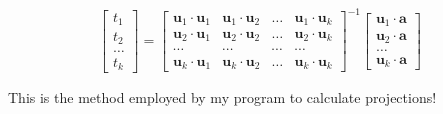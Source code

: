 \documentclass[12pt,leqno]{amsart}
\begin{document}
$$ \begin{bmatrix}
	t_1 \\
	t_2 \\
	\dots \\
	t_k
	\end{bmatrix}	
	= 
	\begin{bmatrix}
	\mathbf{u}_1 \cdot \mathbf{u}_1  & \mathbf{u}_1 \cdot \mathbf{u}_2 & \dots & \mathbf{u}_1 \cdot \mathbf{u}_k \\
	\mathbf{u}_2 \cdot \mathbf{u}_1  & \mathbf{u}_2 \cdot \mathbf{u}_2 & \dots & \mathbf{u}_2 \cdot \mathbf{u}_k \\
	\cdots & \cdots & \cdots & \cdots \\
	\mathbf{u}_k \cdot \mathbf{u}_1 & \mathbf{u}_k \cdot \mathbf{u}_2 & \dots & \mathbf{u}_k \cdot \mathbf{u}_k 
	\end{bmatrix} ^{-1}
	\begin{bmatrix}
	\mathbf{u}_1 \cdot \mathbf{a} \\
	\mathbf{u}_2 \cdot \mathbf{a} \\
	\dots \\
	\mathbf{u}_k \cdot \mathbf{a}
	\end{bmatrix}
$$ 

\noindent This is the method employed by my program to calculate projections!
\end{document}
